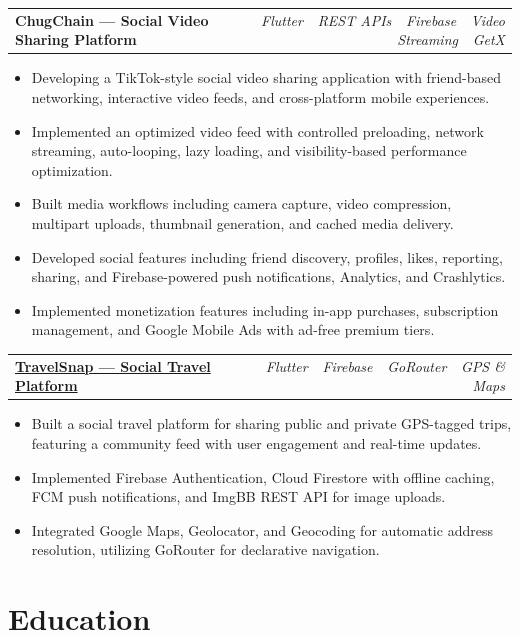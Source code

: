\documentclass[10.5pt, a4paper]{article}
\makeatletter
\newcommand{\projentry}[2]{%
  \vspace{3pt}%
  \begin{tabularx}{\linewidth}{@{}X r@{}}
    \textbf{#1} & {\small\itshape\color{csteel}#2}
  \end{tabularx}%
  \vspace{1pt}%
}
\makeatother
\begin{document}
\vspace{4pt}

\projentry{ChugChain --- Social Video Sharing Platform}{Flutter \,\textbullet\, REST APIs \,\textbullet\, Firebase \,\textbullet\, Video Streaming \,\textbullet\, GetX}
\begin{itemize}
  \item Developing a TikTok-style social video sharing application with friend-based networking, interactive video feeds, and cross-platform mobile experiences.
  \item Implemented an optimized video feed with controlled preloading, network streaming, auto-looping, lazy loading, and visibility-based performance optimization.
  \item Built media workflows including camera capture, video compression, multipart uploads, thumbnail generation, and cached media delivery.
  \item Developed social features including friend discovery, profiles, likes, reporting, sharing, and Firebase-powered push notifications, Analytics, and Crashlytics.
  \item Implemented monetization features including in-app purchases, subscription management, and Google Mobile Ads with ad-free premium tiers.
\end{itemize}

\vspace{4pt}

\projentry{\href{https://github.com/SaidurRahman1004/my_trips}{TravelSnap --- Social Travel Platform}}{Flutter \,\textbullet\, Firebase \,\textbullet\, GoRouter \,\textbullet\, GPS \& Maps}
\begin{itemize}
  \item Built a social travel platform for sharing public and private GPS-tagged trips, featuring a community feed with user engagement and real-time updates.
  \item Implemented Firebase Authentication, Cloud Firestore with offline caching, FCM push notifications, and ImgBB REST API for image uploads.
  \item Integrated Google Maps, Geolocator, and Geocoding for automatic address resolution, utilizing GoRouter for declarative navigation.
\end{itemize}

\section{Education}
\end{document}
